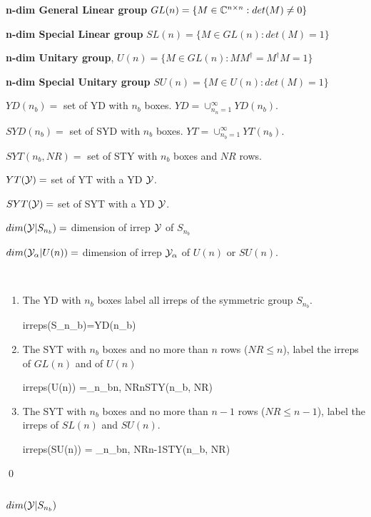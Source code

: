 {\bf n-dim General   Linear group} $GL(n)=\{ M\in{ \mathbb{C}}^{n\times n}:
det(M)\neq 0\}$

{\bf n-dim Special Linear group} $SL(n)=\{ M\in GL(n):
det(M)=1\}$

{\bf n-dim Unitary group}, $U(n)=\{ M\in GL(n):
M M^\dagger =M^\dagger M =1\}$

{\bf n-dim Special Unitary group}
$SU(n)=\{ M\in U(n):
det(M)=1\}$

$YD(n_b)=$ set of YD with $n_b$ boxes.
$YD=\cup_{n_n=1}^\infty YD(n_b)$.

$SYD(n_b)=$ set of SYD with $n_b$ boxes. $YT=\cup_{n_b=1}^\infty YT(n_b)$.

$SYT(n_b, NR)=$ set of STY with $n_b$
boxes and $NR$ rows.

$YT({\cal Y})=$ set of YT with a YD ${\cal Y}$.

$SYT({\cal Y})=$ set of SYT with a YD ${\cal Y}$.


$dim({\cal Y}| S_{n_b})=$ dimension of irrep ${\cal Y}$ of $S_{n_b}$

$dim({\cal Y}_\alpha| U(n))=$ dimension of irrep ${\cal Y}_\alpha$ of $U(n)$ or $SU(n)$.




\begin{claim}\
\begin{enumerate}
\item
The YD with $n_b$ boxes label all irreps of the symmetric group 
$S_{n_b}$.

\beq
irreps(S_{n_b})=YD(n_b)
\eeq

\item
The SYT with $n_b$ boxes and no more than $n$ rows
($NR\leq n$),
label the irreps of $GL(n)$ and of $U(n)$

\beq
irreps(U(n)) =\bigcup_{n_b\leq n, \;NR\leq n}STY(n_b, NR) 
\eeq

\item
The SYT with $n_b$ boxes and
no more than $n-1$
rows ($NR\leq n -1$), label the irreps of $SL(n)$ and $SU(n)$.

\beq
irreps(SU(n)) =
\bigcup_{n_b\leq n,\; NR\leq n-1}STY(n_b, NR) 
\eeq
\end{enumerate}
\end{claim}
\proof
\qed










\subsection{$dim({\cal Y}|S_{n_b})$}

